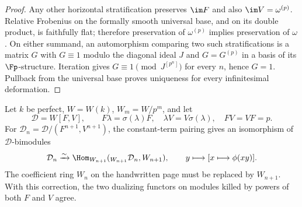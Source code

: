 \begin{proof}
Any other horizontal stratification preserves $\im F$ and also $\im V=\omega^{(p)}$.  Relative Frobenius on the formally smooth universal base, and on its double product, is faithfully flat; therefore preservation of $\omega^{(p)}$ implies preservation of $\omega$.  On either summand, an automorphism comparing two such stratifications is a matrix $G$ with $G\equiv1$ modulo the diagonal ideal $J$ and $G=G^{(p)}$ in a basis of its \etale $\Fp$-structure.  Iteration gives $G\equiv1\pmod{J^{[p^n]}}$ for every $n$, hence $G=1$.  Pullback from the universal base proves uniqueness for every infinitesimal deformation.
\end{proof}

\begin{proposition}[R8, scans 9:5--8]\label{prop:DE-R8}
Let $k$ be perfect, $W=W(k)$, $W_m=W/p^m$, and let
\[
 \mathcal D=W[F,V],\qquad F\lambda=\sigma(\lambda)F,\quad
 \lambda V=V\sigma(\lambda),\quad FV=VF=p.
\]
For $\mathcal D_n=\mathcal D/(F^{n+1},V^{n+1})$, the constant-term pairing gives an isomorphism of $\mathcal D$-bimodules
\[
 \mathcal D_n\xrightarrow{\sim}
 \Hom_{W_{n+1}}({}_{W_{n+1}}\mathcal D_n,W_{n+1}),\qquad
 y\longmapsto[x\longmapsto\phi(xy)].
\]
The coefficient ring $W_n$ on the handwritten page must be replaced by $W_{n+1}$.  With this correction, the two dualizing functors on modules killed by powers of both $F$ and $V$ agree.
\end{proposition}
